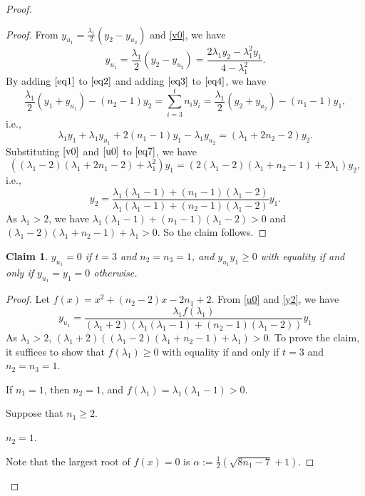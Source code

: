 \documentclass[12pt]{article}
\numberwithin{equation}{section}
\newtheorem {Claim} {Claim}[section]
\begin{document}
\begin{proof}
\begin{proof}
From $y_{u_1}=\frac{\lambda_1}{2}(y_2-y_{u_2})$ and \eqref{v0}, we have
\begin{equation}\label{u0}
y_{u_1}=\frac{\lambda_1}{2}\left(y_2-y_{u_2}\right)=\frac{2\lambda_1y_2-\lambda_1^2y_1}{4-\lambda_1^2}.
\end{equation}
By adding $\eqref{eq1}$ to $\eqref{eq2}$ and adding $\eqref{eq3}$ to $\eqref{eq4}$, we have
\[
\frac{\lambda_1}{2}(y_1+y_{u_1})-(n_2-1)y_2=\sum_{i=3}^tn_iy_i=\frac{\lambda_1}{2}(y_2+y_{u_2})-(n_1-1)y_1, \]
i.e.,
\begin{equation}\label{eq7}
\lambda_1y_1+\lambda_1y_{u_1}+2(n_1-1)y_1-\lambda_1y_{u_2}=(\lambda_1+2n_2-2)y_2.
\end{equation}
Substituting $\eqref{v0}$ and $\eqref{u0}$ to $\eqref{eq7}$, we have
\[
\left((\lambda_1-2)(\lambda_1+2n_1-2)+\lambda_1^2\right)y_1=\left(2(\lambda_1-2)(\lambda_1+n_2-1)+2\lambda_1\right)y_2,
\]
i.e., 
\begin{equation}\label{y2}
y_2 
 =\frac{\lambda_1(\lambda_1-1)+(n_1-1)(\lambda_1-2)}{\lambda_1(\lambda_1-1)+(n_2-1)(\lambda_1-2)}y_1.
\end{equation}
As $\lambda_1>2$, we have  $\lambda_1(\lambda_1-1)+(n_1-1)(\lambda_1-2)>0$ and $(\lambda_1-2)(\lambda_1+n_2-1)+\lambda_1>0$. 
So the claim follows.
\end{proof}

\begin{Claim} \label{Y2}
 $y_{u_1}=0$ if $t=3$ and $n_2=n_3=1$, and 
$y_{u_1}y_1\ge 0$
with equality if and only if $y_{u_1}=y_1=0$ otherwise.
\end{Claim}

\begin{proof}
Let $f(x)=x^2+(n_2-2)x-2n_1+2$. 
From \eqref{u0} and \eqref{y2}, we have
\[
y_{u_1}=\frac{\lambda_1f(\lambda_1)}{(\lambda_1+2)(\lambda_1(\lambda_1-1)+(n_2-1)(\lambda_1-2))}y_1
\]
As $\lambda_1>2$,  $(\lambda_1+2)((\lambda_1-2)(\lambda_1+n_2-1)+\lambda_1)>0$. To prove the claim, it suffices to show that 
 $f(\lambda_1)\ge 0$ with equality if and only if $t=3$ and $n_2=n_3=1$. 



If $n_1=1$, then $n_2=1$, and $f(\lambda_1)=\lambda_1(\lambda_1-1)>0$. 

Suppose that $n_1\ge 2$. 

 $n_2=1$. 

Note that the largest root of $f(x)=0$ is $\alpha:=\frac{1}{2}\left(\sqrt{8n_1-7}+1\right)$. 
 

\end{proof}
\end{proof}
\end{document}
